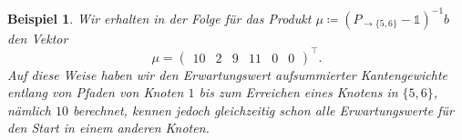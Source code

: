 \documentclass[a4paper]{article}
\newtheorem{beispiel}[satz]{Beispiel}
\theoremstyle{nonumberplain}
\begin{document}
\begin{beispiel}
		Wir erhalten in der Folge für das Produkt $\mu \coloneqq (P_{\rightarrow \{5,6\}} - \mathbb{1})^{-1}b$ den Vektor
		\begin{equation*}
		\mu = \begin{pmatrix} 10 & 2 & 9 & 11 & 0 & 0 \end{pmatrix}^\intercal\text{.}
		\end{equation*}
		Auf diese Weise haben wir den Erwartungswert aufsummierter Kantengewichte entlang von Pfaden von Knoten $1$ bis zum Erreichen eines Knotens in $\{5,6\}$, nämlich $10$ berechnet, kennen jedoch gleichzeitig schon alle Erwartungswerte für den Start in einem anderen Knoten.
	\end{beispiel}
		
	\printbibliography
\end{document}
